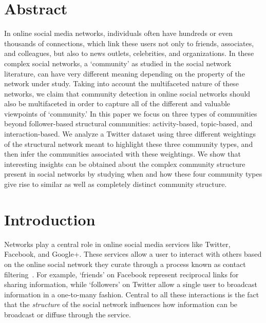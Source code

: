 \documentclass[10pt,letterpaper]{article}
\begin{document}
\section*{Abstract}
In online social media networks, individuals often have hundreds or even thousands of connections, which link these users not only to friends, associates, and colleagues, but also to news outlets, celebrities, and organizations. In these complex social networks, a `community' as studied in the social network literature, can have very different meaning depending on the property of the network under study. Taking into account the multifaceted nature of these networks, we claim that community detection in online social networks should also be multifaceted in order to capture all of the different and valuable viewpoints of `community.' In this paper we focus on three types of communities beyond follower-based structural communities: activity-based, topic-based, and interaction-based. We analyze a Twitter dataset using three different weightings of the structural network meant to highlight these three community types, and then infer the communities associated with these weightings. We show that interesting insights can be obtained about the complex community structure present in  social networks by studying when and how these four community types give rise to similar as well as completely distinct community structure.

\linenumbers

\section{Introduction}

Networks play a central role in online social media services like Twitter, Facebook, and Google+. These services allow a user to interact with others based on the online social network they curate through a process known as contact filtering~\cite{cazabet2012automated}. For example, `friends' on Facebook represent reciprocal links for sharing information, while `followers' on Twitter allow a single user to broadcast information in a one-to-many fashion. Central to all these interactions is the fact that the \emph{structure} of the social network influences how information can be broadcast or diffuse through the service.
\end{document}
